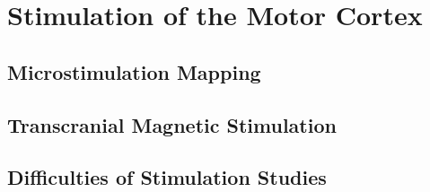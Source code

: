 \section{Stimulation of the Motor Cortex}

\subsection{Microstimulation Mapping}

\subsection{Transcranial Magnetic Stimulation}

\subsection{Difficulties of Stimulation Studies}
